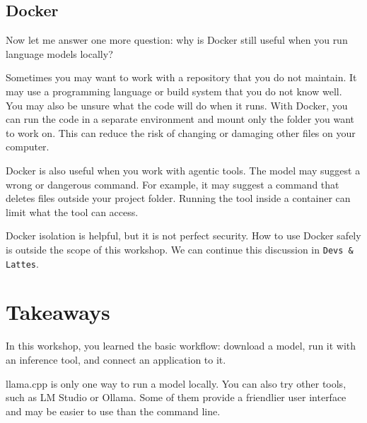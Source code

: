 \documentclass[a4paper,12pt]{article}
\begin{document}
\subsection{Docker}
\label{sec:Docker}

Now let me answer one more question: why is Docker still useful when you run language models locally?

Sometimes you may want to work with a repository that you do not maintain. It may use a programming language or build system that you do not know well. You may also be unsure what the code will do when it runs. With Docker, you can run the code in a separate environment and mount only the folder you want to work on. This can reduce the risk of changing or damaging other files on your computer.

Docker is also useful when you work with agentic tools. The model may suggest a wrong or dangerous command. For example, it may suggest a command that deletes files outside your project folder. Running the tool inside a container can limit what the tool can access.

Docker isolation is helpful, but it is not perfect security. How to use Docker safely is outside the scope of this workshop. We can continue this discussion in \texttt{Devs \& Lattes}.

\section{Takeaways}
In this workshop, you learned the basic workflow: download a model, run it with an inference tool, and connect an application to it.

llama.cpp is only one way to run a model locally. You can also try other tools, such as LM Studio or Ollama. Some of them provide a friendlier user interface and may be easier to use than the command line.
\end{document}
